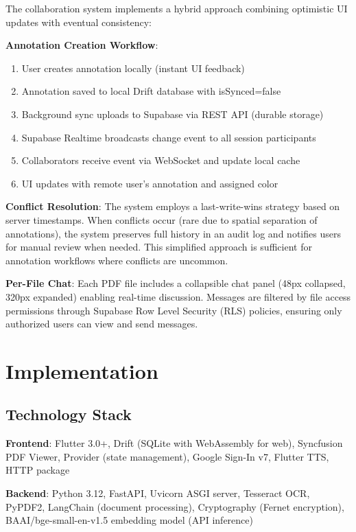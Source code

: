 \documentclass[conference]{IEEEtran}
\begin{document}
The collaboration system implements a hybrid approach combining optimistic UI updates with eventual consistency:

\textbf{Annotation Creation Workflow}:
\begin{enumerate}
\item User creates annotation locally (instant UI feedback)
\item Annotation saved to local Drift database with isSynced=false
\item Background sync uploads to Supabase via REST API (durable storage)
\item Supabase Realtime broadcasts change event to all session participants
\item Collaborators receive event via WebSocket and update local cache
\item UI updates with remote user's annotation and assigned color
\end{enumerate}

\textbf{Conflict Resolution}: The system employs a last-write-wins strategy based on server timestamps. When conflicts occur (rare due to spatial separation of annotations), the system preserves full history in an audit log and notifies users for manual review when needed. This simplified approach is sufficient for annotation workflows where conflicts are uncommon.

\textbf{Per-File Chat}: Each PDF file includes a collapsible chat panel (48px collapsed, 320px expanded) enabling real-time discussion. Messages are filtered by file access permissions through Supabase Row Level Security (RLS) policies, ensuring only authorized users can view and send messages.


\section{Implementation}

\subsection{Technology Stack}

\textbf{Frontend}: Flutter 3.0+, Drift (SQLite with WebAssembly for web), Syncfusion PDF Viewer, Provider (state management), Google Sign-In v7, Flutter TTS, HTTP package

\textbf{Backend}: Python 3.12, FastAPI, Uvicorn ASGI server, Tesseract OCR, PyPDF2, LangChain (document processing), Cryptography (Fernet encryption), BAAI/bge-small-en-v1.5 embedding model (API inference)
\end{document}
